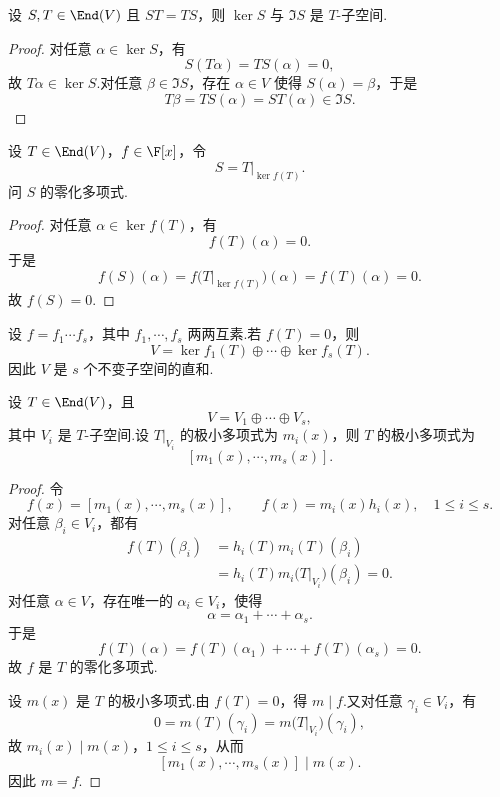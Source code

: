 \begin{example}
设 $S,T\in\End(V)$ 且 $ST=TS$，则 $\ker S$ 与 $\Im S$ 是 $T$-子空间.
\end{example}

\begin{proof}
对任意 $\alpha\in\ker S$，有
\[
S(T\alpha)=TS(\alpha)=0,
\]
故 $T\alpha\in\ker S$.对任意 $\beta\in\Im S$，存在 $\alpha\in V$ 使得 $S(\alpha)=\beta$，于是
\[
T\beta=TS(\alpha)=ST(\alpha)\in\Im S.
\]
\end{proof}

\begin{example}
设 $T\in\End(V)$，$f\in\F[x]$，令
\[
S=T|_{\ker f(T)}.
\]
问 $S$ 的零化多项式.
\end{example}

\begin{proof}
对任意 $\alpha\in\ker f(T)$，有
\[
f(T)(\alpha)=0.
\]
于是
\[
f(S)(\alpha)=f\bigl(T|_{\ker f(T)}\bigr)(\alpha)=f(T)(\alpha)=0.
\]
故 $f(S)=0$.
\end{proof}

\begin{example}
设 $f=f_1\cdots f_s$，其中 $f_1,\cdots,f_s$ 两两互素.若 $f(T)=0$，则
\[
V=\ker f_1(T)\oplus\cdots\oplus\ker f_s(T).
\]
因此 $V$ 是 $s$ 个不变子空间的直和.
\end{example}

\begin{proposition}
设 $T\in\End(V)$，且
\[
V=V_1\oplus\cdots\oplus V_s,
\]
其中 $V_i$ 是 $T$-子空间.设 $T|_{V_i}$ 的极小多项式为 $m_i(x)$，则 $T$ 的极小多项式为
\[
[m_1(x),\cdots,m_s(x)].
\]
\end{proposition}

\begin{proof}
令
\[
f(x)=[m_1(x),\cdots,m_s(x)],
\qquad
f(x)=m_i(x)h_i(x),\quad 1\leq i\leq s.
\]
对任意 $\beta_i\in V_i$，都有
\[
\begin{aligned}
	f(T)(\beta_i)
	&=h_i(T)m_i(T)(\beta_i)\\
	&=h_i(T)m_i\bigl(T|_{V_i}\bigr)(\beta_i)=0.
\end{aligned}
\]
对任意 $\alpha\in V$，存在唯一的 $\alpha_i\in V_i$，使得
\[
\alpha=\alpha_1+\cdots+\alpha_s.
\]
于是
\[
f(T)(\alpha)=f(T)(\alpha_1)+\cdots+f(T)(\alpha_s)=0.
\]
故 $f$ 是 $T$ 的零化多项式.

设 $m(x)$ 是 $T$ 的极小多项式.由 $f(T)=0$，得 $m\mid f$.又对任意 $\gamma_i\in V_i$，有
\[
0=m(T)(\gamma_i)=m\bigl(T|_{V_i}\bigr)(\gamma_i),
\]
故 $m_i(x)\mid m(x)$，$1\leq i\leq s$，从而
\[
[m_1(x),\cdots,m_s(x)]\mid m(x).
\]
因此 $m=f$.
\end{proof}
